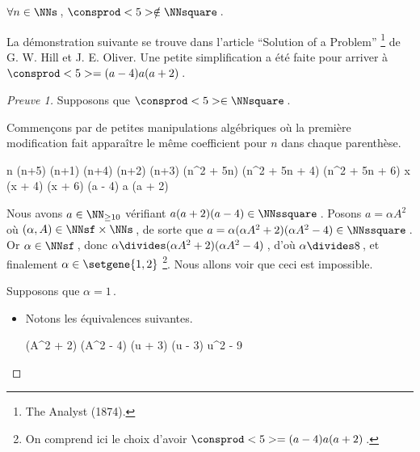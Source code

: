 \begin{fact} \label{case-6}
	 $\forall n \in \NNs$\,, $\consprod<5> \notin \NNsquare$\,.
\end{fact}




La démonstration suivante se trouve dans l'article \enquote{Solution of a Problem}
\footnote{
	The Analyst (1874).
}
de G. W. Hill et J. E. Oliver.
Une petite simplification a été faite pour arriver à $\consprod<5> = (a - 4) a (a + 2)$\,.


\begin{proof}[Preuve 1]%
    Supposons que $\consprod<5> \in \NNsquare$\,.
    
    \smallskip
    
    Commençons par de petites manipulations algébriques où la première modification fait apparaître le même coefficient pour $n$ dans chaque parenthèse.
    
    \medskip
    \begin{stepcalc}[style = sar]
	\explnext{}
		n (n+5) \cdot (n+1) (n+4) \cdot (n+2) (n+3)
	\explnext{}
		(n^2 + 5n) (n^2 + 5n + 4) (n^2 + 5n + 6)
		x (x + 4) (x + 6)
		(a - 4) a (a + 2)
    \end{stepcalc}
  
    \medskip
    Nous avons $a \in \NN_{\geq 10}$ vérifiant $a (a + 2) (a - 4) \in \NNssquare$\,. 
    Posons $a = \alpha A^2$ où $(\alpha, A) \in \NNsf \times \NNs$\,,
    de sorte que $a = \alpha (\alpha A^2 + 2) (\alpha A^2 - 4) \in \NNssquare$\,.
    Or $\alpha\in \NNsf$\,, donc $\alpha \divides (\alpha A^2 + 2) (\alpha A^2 - 4)$\,, 
    d'où $\alpha \divides 8$\,, et finalement $\alpha \in \setgene{1, 2}$
    \footnote{
    	On comprend ici le choix d'avoir $\consprod<5> = (a - 4) a (a + 2)$\,.
    }.
    Nous allons voir que ceci est impossible.
    
    \medskip
    
    Supposons que $\alpha = 1$\,.
    
    \begin{itemize}
    	\item Notons les équivalences suivantes.
        
        \noindent\kern-6pt%
        \begin{stepcalc}[style=ar*, ope=\iff]
        	(A^2 + 2) (A^2 - 4) \in \NNssquare
        	(u + 3) (u - 3) \in \NNssquare
    	\explnext{}
        	u^2 - 9 \in \NNssquare
        \end{stepcalc}


\end{itemize}
\end{proof}
